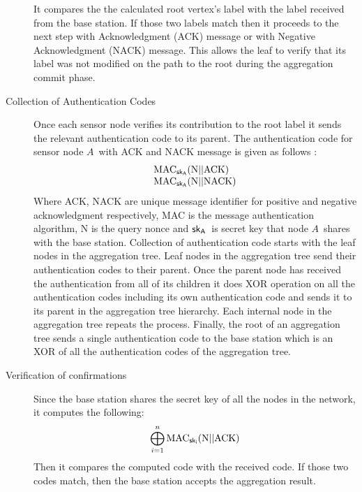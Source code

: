 \begin{description}
			It compares the the calculated root vertex's label with the label received from the base station.
			If those two labels match then it proceeds to the next step with Acknowledgment (ACK) message or with Negative Acknowledgment (NACK) message.
			This allows the leaf to verify that its label was not modified on the path to the root during the aggregation commit phase.
		\item[Collection of Authentication Codes] 
			Once each sensor node verifies its contribution to the root label it sends the relevant authentication code to its parent.
			The authentication code for sensor node $A$\ with ACK and NACK message is given as follows :
			\begin{equation*}
				\begin{array}{l}
					\mbox{MAC}_{\sf{sk}_{A}}( \mbox{N} || \mbox{ACK})\\
					\mbox{MAC}_{\sf{sk}_{A}}( \mbox{N} || \mbox{NACK})	
				\end{array}
			\end{equation*}
			Where ACK, NACK are unique message identifier for positive and negative acknowledgment respectively, 
			MAC is  the message authentication algorithm, 
			N is the query nonce and $\sf{sk}_{A}$\ is secret key that node $A$\ shares with the base station.
			Collection of authentication code starts with the leaf nodes in the aggregation tree.
			Leaf nodes in the aggregation tree send their authentication codes to their parent.
			Once the parent node has received the authentication from all of its children it does XOR operation on all the authentication codes including its own authentication code and sends it to its parent in the aggregation tree hierarchy.
			Each internal node in the aggregation tree repeats the process.
			Finally, the root of an aggregation tree sends a single authentication code to the base station which is an XOR of all the authentication codes of the aggregation tree.  
		\item[Verification of confirmations]
			Since the base station shares the secret key of all the nodes in the network, it computes the following:
			\begin{equation*}
				\bigoplus_{i = 1}^n \mbox{MAC}_{\sf{sk}_{i}}(\mbox{N} || \mbox{ACK})
			\end{equation*}
			Then it compares the computed code with the received code. 
			If those two codes match, then the base station accepts the aggregation result.
	\end{description}

